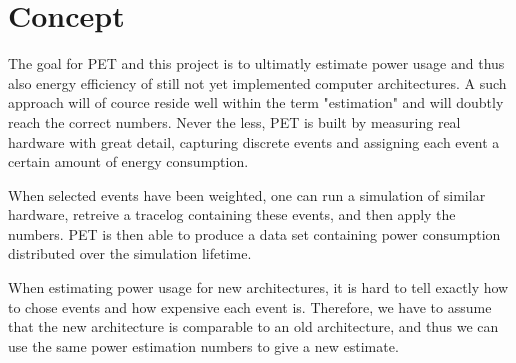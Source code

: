 \section{Concept}
The goal for PET and this project is to ultimatly estimate power usage and thus
also energy efficiency of still not yet implemented computer architectures. A
such approach will of cource reside well within the term "estimation" and will
doubtly reach the correct numbers. Never the less, PET is built by measuring
real hardware with great detail, capturing discrete events and assigning each
event a certain amount of energy consumption.

When selected events have been weighted, one can run a simulation of similar
hardware, retreive a tracelog containing these events, and then apply the
numbers. PET is then able to produce a data set containing power consumption
distributed over the simulation lifetime.

When estimating power usage for new architectures, it is hard to tell exactly
how to chose events and how expensive each event is. Therefore, we have to
assume that the new architecture is comparable to an old architecture, and thus
we can use the same power estimation numbers to give a new estimate.
